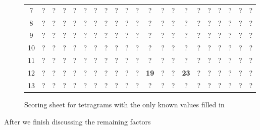 \begin{figure}[H]
\begin{center}
{\begin{tabular}{|c|*{20}{c|}}
				7  & ?          & ?           & ?            & ?           & ?          & ?           & ?            & ?             & ?           & ?          & ?           & ?            & ?             & ?            & ?           & ?            & ?             & ?              & ?            & ?           \\
				8  & ?          & ?           & ?            & ?           & ?          & ?           & ?            & ?             & ?           & ?          & ?           & ?            & ?             & ?            & ?           & ?            & ?             & ?              & ?            & ?           \\
				9  & ?          & ?           & ?            & ?           & ?          & ?           & ?            & ?             & ?           & ?          & ?           & ?            & ?             & ?            & ?           & ?            & ?             & ?              & ?            & ?           \\
				10 & ?          & ?           & ?            & ?           & ?          & ?           & ?            & ?             & ?           & ?          & ?           & ?            & ?             & ?            & ?           & ?            & ?             & ?              & ?            & ?           \\
				11 & ?          & ?           & ?            & ?           & ?          & ?           & ?            & ?             & ?           & ?          & ?           & ?            & ?             & ?            & ?           & ?            & ?             & ?              & ?            & ?           \\
				12 & ?          & ?           & ?            & ?           & ?          & ?           & ?            & ?             & ?           & ?          & {\bf{19}}   & ?            & ?             & {\bf{23}}    & ?           & ?            & ?             & ?              & ?            & ?           \\
				13 & ?          & ?           & ?            & ?           & ?          & ?           & ?            & ?             & ?           & ?          & ?           & ?            & ?             & ?            & ?           & ?            & ?             & ?              & ?            & ?           \\
				\hline
			\end{tabular}}
	\end{center}
	\caption{Scoring sheet for tetragrams with the only known values filled in}
\end{figure}
After we finish discussing the remaining factors
